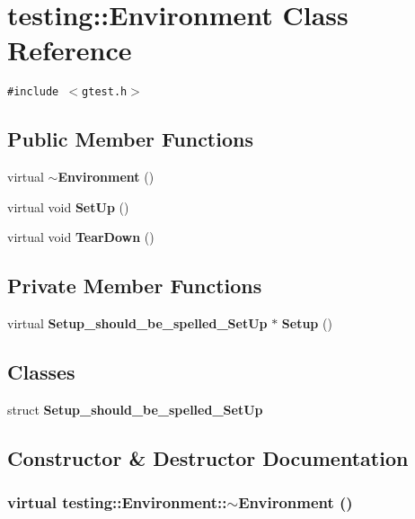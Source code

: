 \section{testing::Environment Class Reference}
\label{classtesting_1_1Environment}
{\tt \#include $<$gtest.h$>$}

\subsection*{Public Member Functions}
\begin{CompactItemize}
\item 
virtual {\bf $\sim$Environment} ()
\item 
virtual void {\bf SetUp} ()
\item 
virtual void {\bf TearDown} ()
\end{CompactItemize}
\subsection*{Private Member Functions}
\begin{CompactItemize}
\item 
virtual {\bf Setup\_\-should\_\-be\_\-spelled\_\-SetUp} $\ast$ {\bf Setup} ()
\end{CompactItemize}
\subsection*{Classes}
\begin{CompactItemize}
\item 
struct {\bf Setup\_\-should\_\-be\_\-spelled\_\-SetUp}
\end{CompactItemize}


\subsection{Constructor \& Destructor Documentation}
\subsubsection{\setlength{\rightskip}{0pt plus 5cm}virtual testing::Environment::$\sim$Environment ()\hspace{0.3cm}{\tt  [inline, virtual]}}\label{classtesting_1_1Environment_1febe35c894ab431777a8ef7079f86c3}




